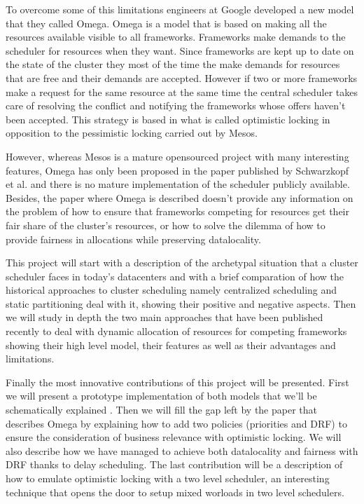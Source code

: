 \documentclass{svjour3}                     %
\begin{document}
To overcome some of this limitations engineers at Google developed a
new model that they called Omega. Omega is a model that is based on
making all the resources available visible to all
frameworks. Frameworks make demands to the scheduler for resources
when they want. Since frameworks are kept up to date on the state of
the cluster they most of the time the make demands for resources that
are free and their demands are accepted. However if two or more
frameworks make a request for the same resource at the same time the
central scheduler takes care of resolving the conflict and notifying
the frameworks whose offers haven't been accepted. This strategy is
based in what is called optimistic locking in opposition to the
pessimistic locking carried out by Mesos.

However, whereas Mesos is a mature opensourced project with many
interesting features, Omega has only been proposed in the paper
published by Schwarzkopf et al. and there is no mature implementation
of the scheduler publicly available. Besides, the paper where Omega is
described doesn't provide any information on the problem of how to
ensure that frameworks competing for resources get their fair share of
the cluster's resources, or how to solve the dilemma of how to provide
fairness in allocations while preserving datalocality.

This project will start with a description of the archetypal situation
that a cluster scheduler faces in today's datacenters and with a brief
comparation of how the historical approaches to cluster scheduling
namely centralized scheduling and static partitioning deal with it,
showing their positive and negative aspects. Then we will study in
depth the two main approaches that have been published recently to
deal with dynamic allocation of resources for competing frameworks
showing their high level model, their features as well as their
advantages and limitations.

Finally the most innovative contributions of this project will be
presented. First we will present a prototype implementation of both
models that we'll be schematically explained . Then we will fill the
gap left by the paper that describes Omega by explaining how to add
two policies (priorities and DRF) to ensure the consideration of
business relevance with optimistic locking. We will also describe how
we have managed to achieve both datalocality and fairness with DRF
thanks to delay scheduling. The last contribution will be a
description of how to emulate optimistic locking with a two level
scheduler, an interesting technique that opens the door to setup mixed
worloads in two level schedulers.
\end{document}
